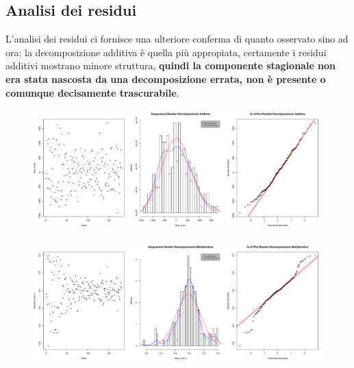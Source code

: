 \documentclass[11pt,a4paper]{article}
\begin{document}
\subsection{Analisi dei residui}
L'analisi dei residui ci fornisce una ulteriore conferma di quanto osservato
sino ad ora: la decomposizione additiva \`e quella pi\`u appropiata, certamente
i residui additivi mostrano minore struttura, \textbf{quindi la componente
stagionale non era stata nascosta da una decomposizione errata, non \`e presente
o comunque decisamente trascurabile}.
\begin{figure}[H]
	\vspace{-0.3cm}
	\hspace{-2.7cm}
	\includegraphics[scale=0.55]{imgs/additive_residuals.pdf}
\end{figure}
\begin{figure}[H]
	\vspace{-0.3cm}
	\hspace{-2.7cm}
	\includegraphics[scale=0.55]{imgs/multiplicative_residuals.pdf}
\end{figure}
\end{document}
